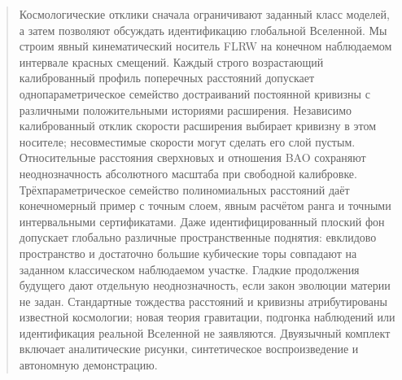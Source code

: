 \maketitle
\begin{abstract}
{Космологические отклики сначала ограничивают заданный класс моделей, а затем позволяют обсуждать идентификацию глобальной Вселенной. Мы строим явный кинематический носитель FLRW на конечном наблюдаемом интервале красных смещений. Каждый строго возрастающий калиброванный профиль поперечных расстояний допускает однопараметрическое семейство достраиваний постоянной кривизны с различными положительными историями расширения. Независимо калиброванный отклик скорости расширения выбирает кривизну в этом носителе; несовместимые скорости могут сделать его слой пустым. Относительные расстояния сверхновых и отношения BAO сохраняют неоднозначность абсолютного масштаба при свободной калибровке. Трёхпараметрическое семейство полиномиальных расстояний даёт конечномерный пример с точным слоем, явным расчётом ранга и точными интервальными сертификатами. Даже идентифицированный плоский фон допускает глобально различные пространственные поднятия: евклидово пространство и достаточно большие кубические торы совпадают на заданном классическом наблюдаемом участке. Гладкие продолжения будущего дают отдельную неоднозначность, если закон эволюции материи не задан. Стандартные тождества расстояний и кривизны атрибутированы известной космологии; новая теория гравитации, подгонка наблюдений или идентификация реальной Вселенной не заявляются. Двуязычный комплект включает аналитические рисунки, синтетическое воспроизведение и автономную демонстрацию.}
\end{abstract}
